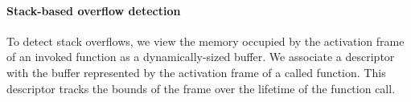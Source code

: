 \documentclass[letterpaper,twocolumn,10pt]{article}
\newcommand{\comment}[1]{}
\begin{document}




\paragraph{Stack-based overflow detection}

To detect stack overflows, we view the memory occupied by the activation frame of an invoked function as a dynamically-sized buffer. %
We associate a descriptor with the buffer represented by the activation frame of a called function. This descriptor tracks the bounds of the frame over the lifetime of the function call.
\end{document}
